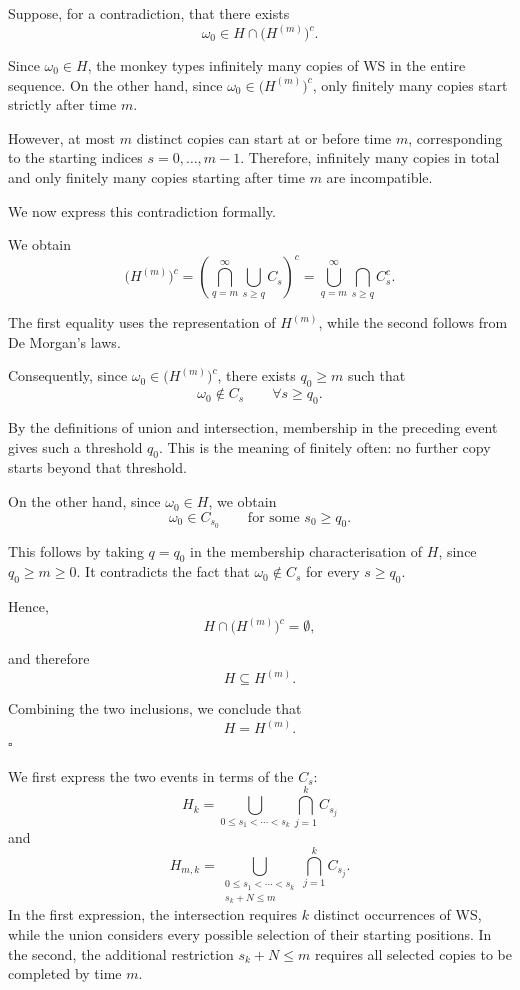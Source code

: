 \documentclass[11pt,a4paper]{article}
\newcommand{\studyheading}[1]{{\color{StudyBlue}\normalfont\bfseries\boldmath #1}}
\newcommand{\studylabel}[1]{\textcolor{StudyBlue}{\textnormal{\bfseries #1}}}
\begin{document}
Suppose, for a contradiction, that there exists
\[
\omega_0\in H\cap\bigl(H^{(m)}\bigr)^c.
\]

Since $\omega_0\in H$, the monkey types infinitely many copies of WS in the entire sequence. On the other hand, since $\omega_0\in\bigl(H^{(m)}\bigr)^c$, only finitely many copies start strictly after time $m$.

However, at most $m$ distinct copies can start at or before time $m$, corresponding to the starting indices $s=0,\ldots,m-1$. Therefore, infinitely many copies in total and only finitely many copies starting after time $m$ are incompatible.

We now express this contradiction formally.

We obtain
\[
\bigl(H^{(m)}\bigr)^c
=\left(
\bigcap_{q=m}^{\infty}
\bigcup_{s\ge q}C_s
\right)^c
=\bigcup_{q=m}^{\infty}
\bigcap_{s\ge q}C_s^c.
\]

The first equality uses the representation of $H^{(m)}$, while the second follows from De Morgan's laws.

Consequently, since $\omega_0\in\bigl(H^{(m)}\bigr)^c$, there exists $q_0\ge m$ such that
\[
\omega_0\notin C_s
\qquad\forall s\ge q_0.
\]

By the definitions of union and intersection, membership in the preceding event gives such a threshold $q_0$. This is the meaning of finitely often: no further copy starts beyond that threshold.

On the other hand, since $\omega_0\in H$, we obtain
\[
\omega_0\in C_{s_0}
\qquad\text{for some }s_0\ge q_0.
\]

This follows by taking $q=q_0$ in the membership characterisation of $H$, since $q_0\ge m\ge0$. It contradicts the fact that $\omega_0\notin C_s$ for every $s\ge q_0$.

Hence,
\[
H\cap\bigl(H^{(m)}\bigr)^c=\emptyset,
\]

and therefore
\[
H\subseteq H^{(m)}.
\]

Combining the two inclusions, we conclude that
\[
H=H^{(m)}.
\]
\hfill$\square$


\noindent\studyheading{\studylabel{(iv)}} We first express the two events in terms of the $C_s$:
\[
H_k
=
\bigcup_{0\le s_1<\cdots<s_k}
\bigcap_{j=1}^{k}C_{s_j}
\]
and
\[
H_{m,k}
=
\bigcup_{\substack{0\le s_1<\cdots<s_k\\s_k+N\le m}}
\bigcap_{j=1}^{k}C_{s_j}.
\]
In the first expression, the intersection requires $k$ distinct occurrences of WS, while the union considers every possible selection of their starting positions. In the second, the additional restriction $s_k+N\le m$ requires all selected copies to be completed by time $m$.
\end{document}
